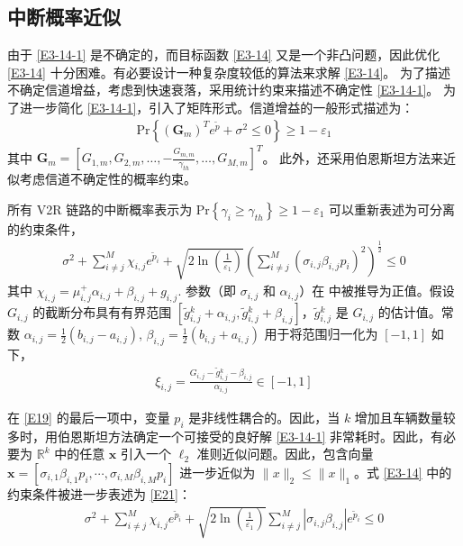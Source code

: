 \subsection{中断概率近似}\label{section3-3-2}

由于 \eqref{E3-14-1} 是不确定的，而目标函数 \eqref{E3-14} 又是一个非凸问题，因此优化 \eqref{E3-14} 十分困难。有必要设计一种复杂度较低的算法来求解 \eqref{E3-14}。 为了描述不确定信道增益，考虑到快速衰落，采用统计约束来描述不确定性 \eqref{E3-14-1}。 为了进一步简化 \eqref{E3-14-1}，引入了矩阵形式。信道增益的一般形式描述为：
\begin{eqnarray}\label{E18}
\textrm{Pr}\left\{\left(\textbf{G}_m\right)^Te^{\widetilde{p}}+\sigma^2\le0\right\}\geq1-\varepsilon_1
\end{eqnarray}
其中 $\textbf{G}_m=\left[G_{1,m},G_{2,m},\ldots,-\frac{G_{m,m}}{\gamma_{th}},\ldots,G_{M,m}\right]^T$。
此外，还采用伯恩斯坦方法来近似考虑信道不确定性的概率约束。

所有 V2R 链路的中断概率表示为 $\textrm{Pr}\left\{\gamma_i\geq\gamma_{th}\right\}\geq1-\varepsilon_1$
可以重新表述为可分离的约束条件，
\begin{eqnarray}\label{E19}
\!\!\!\sigma^2+\!\sum_{i\neq j}^{M}{\chi_{i,j}e^{{\widetilde{p}}_i}}+\sqrt{2\ln\left(\frac{1}{\varepsilon_1}\right)}\left(\sum_{i\neq j}^{M}\left(\sigma_{i,j}\beta_{i,j}p_i\right)^2\right)^\frac{1}{2}\!\!\!\!\!\le0
\end{eqnarray}
其中 $\chi_{i,j}=\mu_{i,j}^+\alpha_{i,j}+\beta_{i,j}+g_{i,j}$. 参数（即 $\sigma_{i,j}$ 和 $\alpha_{i,j}$）在 \cite{CCO} 中被推导为正值。假设 $G_{i,j}$ 的截断分布具有有界范围 $\left[{\widetilde{g}}\phantom{}_{i,j}^k+\alpha_{i,j},{\widetilde{g}}\phantom{}_{i,j}^k+\beta_{i,j}\right]$，${\widetilde{g}}\phantom{}_{i,j}^k$ 是 $G_{i,j}$ 的估计值。常数 $\alpha_{i,j}=\frac{1}{2}\left(b_{i,j}-a_{i,j}\right)$, $\beta_{i,j}=\frac{1}{2}\left(b_{i,j}+a_{i,j}\right)$ 用于将范围归一化为 $\left[-1,1\right]$ 如下，
\begin{eqnarray}\label{E20}
\xi_{i,j}=\frac{G_{i,j}-{\widetilde{g}}\phantom{}_{i,j}^k-\beta_{i,j}}{\alpha_{i,j}}\in\left[-1,1\right]
\end{eqnarray}

在 \eqref{E19} 的最后一项中，变量 $p_i$ 是非线性耦合的。因此，当 $k$ 增加且车辆数量较多时，用伯恩斯坦方法确定一个可接受的良好解 \eqref{E3-14-1} 非常耗时。因此，有必要为 $\mathbb{R}^k$ 中的任意 $\mathbf{x}$ 引入一个 $\ell_2$ 准则近似问题。因此，包含向量 $\mathbf{x}=\left[\sigma_{i,1}\beta_{i,1}p_i,\cdots,\sigma_{i,M}\beta_{i,M}p_i\right]$ 进一步近似为 $\parallel x\parallel_2 \le \parallel x\parallel_1$。式 \eqref{E3-14} 中的约束条件被进一步表述为 \eqref{E21}：
\begin{eqnarray}\label{E21}
\sigma^2+\sum_{i\neq j}^{M}{\chi_{i,j}e^{{\widetilde{p}}_i}}+\sqrt{2\ln\left(\frac{1}{\varepsilon_1}\right)}\sum_{i\neq j}^{M}{\left|\sigma_{i,j}\beta_{i,j}\right|e^{{\widetilde{p}}_i}}\le0
\end{eqnarray}

